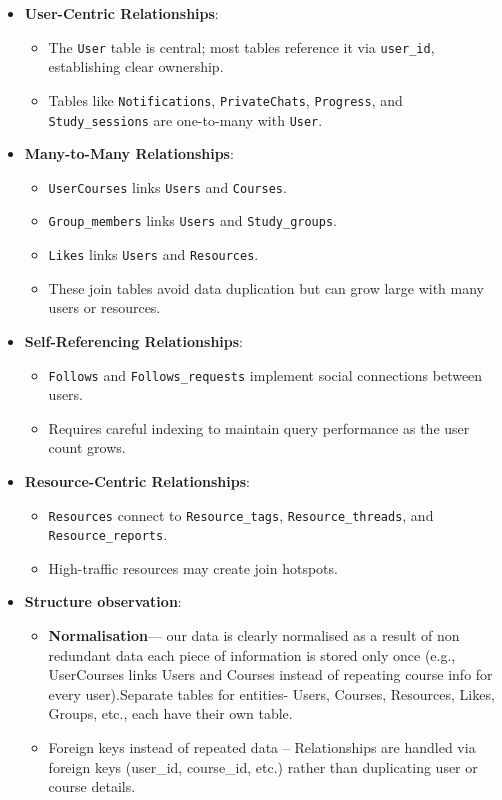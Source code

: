 \begin{itemize}
    \item \textbf{User-Centric Relationships}: 
    \begin{itemize}
        \item The \texttt{User} table is central; most tables reference it via \texttt{user\_id}, establishing clear ownership.
        \item Tables like \texttt{Notifications}, \texttt{PrivateChats}, \texttt{Progress}, and \texttt{Study\_sessions} are one-to-many with \texttt{User}.
    \end{itemize}

    \item \textbf{Many-to-Many Relationships}:
    \begin{itemize}
        \item \texttt{UserCourses} links \texttt{Users} and \texttt{Courses}.
        \item \texttt{Group\_members} links \texttt{Users} and \texttt{Study\_groups}.
        \item \texttt{Likes} links \texttt{Users} and \texttt{Resources}.
        \item These join tables avoid data duplication but can grow large with many users or resources.
    \end{itemize}

    \item \textbf{Self-Referencing Relationships}:
    \begin{itemize}
        \item \texttt{Follows} and \texttt{Follows\_requests} implement social connections between users.
        \item Requires careful indexing to maintain query performance as the user count grows.
    \end{itemize}

    \item \textbf{Resource-Centric Relationships}:
    \begin{itemize}
        \item \texttt{Resources} connect to \texttt{Resource\_tags}, \texttt{Resource\_threads}, and \texttt{Resource\_reports}.
        \item High-traffic resources may create join hotspots.
    \end{itemize}
    
     \item \textbf{Structure observation}:
    \begin{itemize}
        \item \textbf{Normalisation}--- our data is clearly normalised as a result of non redundant data each piece of information is stored only once (e.g., UserCourses links Users and Courses instead of repeating course info for every user).Separate tables for entities-  Users, Courses, Resources, Likes, Groups, etc., each have their own table.
        \item Foreign keys instead of repeated data – Relationships are handled via foreign keys (user\_id, course\_id, etc.) rather than duplicating user or course details.
    \end{itemize}


\end{itemize}
